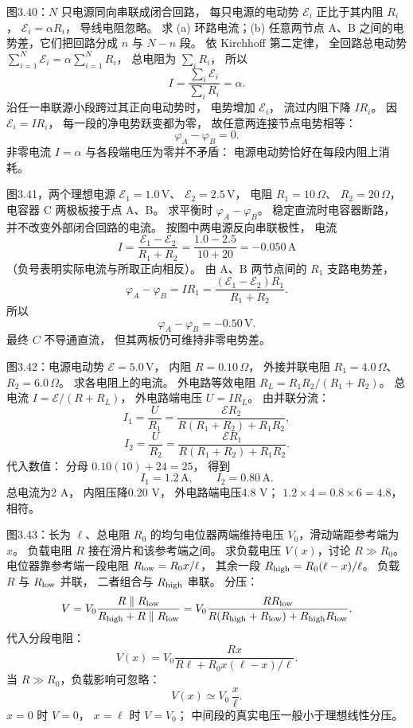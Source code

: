 图3.40：$N$ 只电源同向串联成闭合回路，
每只电源的电动势 $\mathcal E_i$
正比于其内阻 $R_i$，
$\mathcal E_i=\alpha R_i$，
导线电阻忽略。
求 (a) 环路电流；(b) 任意两节点 A、B
之间的电势差，它们把回路分成 $n$ 与
$N-n$ 段。
\exsolution
依 Kirchhoff 第二定律，
全回路总电动势
$\sum_{i=1}^{N}\mathcal E_i
=\alpha\sum_{i=1}^{N}R_i$，
总电阻为 $\sum_iR_i$，
所以
\[
\boxed{I=
\frac{\sum_i\mathcal E_i}{\sum_iR_i}
=\alpha}.
\]
沿任一串联源小段跨过其正向电动势时，
电势增加 $\mathcal E_i$，
流过内阻下降 $IR_i$。
因 $\mathcal E_i=IR_i$，
每一段的净电势跃变都为零，
故任意两连接节点电势相等：
\[
\boxed{\varphi_A-\varphi_B=0}.
\]
\excheck 非零电流 $I=\alpha$
与各段端电压为零并不矛盾：
电源电动势恰好在每段内阻上消耗。

图3.41，两个理想电源
$\mathcal E_1=1.0\,\mathrm V$、
$\mathcal E_2=2.5\,\mathrm V$，
电阻
$R_1=10\,\Omega$、
$R_2=20\,\Omega$，
电容器 C 两极板接于点 A、B。
求平衡时 $\varphi_A-\varphi_B$。
\exsolution
稳定直流时电容器断路，
并不改变外部闭合回路的电流。
按图中两电源反向串联极性，
电流
\[
I=\frac{\mathcal E_1-\mathcal E_2}{R_1+R_2}
=\frac{1.0-2.5}{10+20}
=-0.050\,\mathrm A
\]
（负号表明实际电流与所取正向相反）。
由 A、B 两节点间的 $R_1$ 支路电势差，
\[
\varphi_A-\varphi_B=IR_1
=\frac{(\mathcal E_1-\mathcal E_2)R_1}
{R_1+R_2}.
\]
所以
\[
\boxed{\varphi_A-\varphi_B=-0.50\,\mathrm V}.
\]
\excheck 最终 $C$ 不导通直流，
但其两板仍可维持非零电势差。

图3.42：电源电动势
$\mathcal E=5.0\,\mathrm V$，
内阻 $R=0.10\,\Omega$，
外接并联电阻
$R_1=4.0\,\Omega$、
$R_2=6.0\,\Omega$。
求各电阻上的电流。
\exsolution
外电路等效电阻
$R_L=R_1R_2/(R_1+R_2)$。
总电流
$I=\mathcal E/(R+R_L)$，
外电路端电压
$U=IR_L$。
由并联分流：
\[
I_1=\frac U{R_1}
=\boxed{\frac{\mathcal E R_2}
{R(R_1+R_2)+R_1R_2}},
\]
\[
I_2=\frac U{R_2}
=\boxed{\frac{\mathcal E R_1}
{R(R_1+R_2)+R_1R_2}}.
\]
代入数值：
分母 $0.10(10)+24=25$，
得到
\[
\boxed{I_1=1.2\,\mathrm A,\qquad
I_2=0.80\,\mathrm A}.
\]
\excheck 总电流为2 A，
内阻压降0.20 V，
外电路端电压4.8 V；
$1.2\times4=0.8\times6=4.8$，相符。

图3.43：长为 $\ell$、总电阻
$R_0$ 的均匀电位器两端维持电压
$V_0$，滑动端距参考端为 $x$。
负载电阻 $R$ 接在滑片和该参考端之间。
求负载电压 $V(x)$，讨论 $R\gg R_0$。
\exsolution
电位器靠参考端一段电阻
$R_{\rm low}=R_0x/\ell$，
其余一段
$R_{\rm high}=R_0(\ell-x)/\ell$。
负载 $R$ 与 $R_{\rm low}$ 并联，
二者组合与 $R_{\rm high}$ 串联。
分压：
\[
V=V_0\frac{R\parallel R_{\rm low}}
{R_{\rm high}+R\parallel R_{\rm low}}
=V_0\frac{RR_{\rm low}}
{R(R_{\rm high}+R_{\rm low})
+R_{\rm high}R_{\rm low}}.
\]
代入分段电阻：
\[
\boxed{V(x)=
V_0\frac{Rx}
{R\ell+R_0x(\ell-x)/\ell}}.
\]
当 $R\gg R_0$，负载影响可忽略：
\[
\boxed{V(x)\simeq V_0\,\frac{x}{\ell}}.
\]
\excheck $x=0$ 时 $V=0$，
$x=\ell$ 时 $V=V_0$；
中间段的真实电压一般小于理想线性分压。


